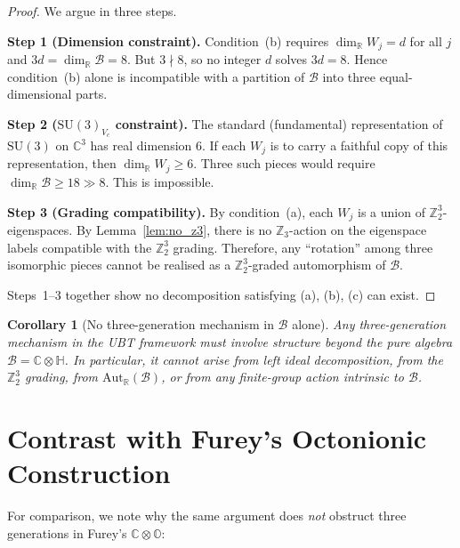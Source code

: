 \documentclass[12pt,a4paper]{article}
\newtheorem{corollary}[theorem]{Corollary}
\theoremstyle{remark}
\begin{document}
\begin{proof}
  We argue in three steps.

  \medskip\noindent\textbf{Step 1 (Dimension constraint).}
  Condition~(b) requires $\dim_\mathbb{R} W_j = d$ for all $j$ and
  $3d = \dim_\mathbb{R}\mathcal{B} = 8$.  But $3 \nmid 8$, so no integer $d$
  solves $3d = 8$.  Hence condition~(b) alone is incompatible with
  a partition of $\mathcal{B}$ into three equal-dimensional parts.

  \medskip\noindent\textbf{Step 2 ($\mathrm{SU}(3)_{V_c}$ constraint).}
  The standard (fundamental) representation of $\mathrm{SU}(3)$ on $\mathbb{C}^3$
  has real dimension $6$.  If each $W_j$ is to carry a faithful copy of this
  representation, then $\dim_\mathbb{R} W_j \geq 6$.  Three such pieces would
  require $\dim_\mathbb{R}\mathcal{B} \geq 18 \gg 8$.  This is impossible.

  \medskip\noindent\textbf{Step 3 (Grading compatibility).}
  By condition~(a), each $W_j$ is a union of $\mathbb{Z}_2^3$-eigenspaces.
  By Lemma~\ref{lem:no_z3}, there is no $\mathbb{Z}_3$-action on the
  eigenspace labels compatible with the $\mathbb{Z}_2^3$ grading.  Therefore,
  any ``rotation'' among three isomorphic pieces cannot be realised as a
  $\mathbb{Z}_2^3$-graded automorphism of $\mathcal{B}$.

  Steps~1--3 together show no decomposition satisfying (a), (b), (c)
  can exist.
\end{proof}

\begin{corollary}[No three-generation mechanism in $\mathcal{B}$ alone]
  \label{cor:no_three_gen}
  Any three-generation mechanism in the UBT framework must involve structure
  beyond the pure algebra $\mathcal{B} = \mathbb{C}\otimes\mathbb{H}$.
  In particular, it cannot arise from left ideal decomposition, from the
  $\mathbb{Z}_2^3$ grading, from $\mathrm{Aut}_\mathbb{R}(\mathcal{B})$,
  or from any finite-group action intrinsic to $\mathcal{B}$.
\end{corollary}

\section{Contrast with Furey's Octonionic Construction}
\label{sec:furey_contrast}

For comparison, we note why the same argument does \emph{not} obstruct
three generations in Furey's $\mathbb{C}\otimes\mathbb{O}$:
\end{document}

